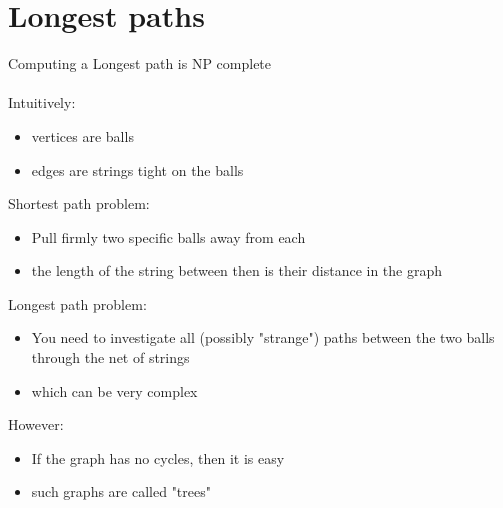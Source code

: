 \documentclass{article}[18pt]
\begin{document}
\section{Longest paths}
Computing a Longest path is NP complete\\
\\
Intuitively:
\begin{itemize}
	\item vertices are balls
	\item edges are strings tight on the balls
\end{itemize}
Shortest path problem:
\begin{itemize}
	\item Pull firmly two specific balls away from each
	\item the length of the string between then is their distance in the graph
\end{itemize}
Longest path problem:
\begin{itemize}
	\item You need to investigate all (possibly "strange") paths between the two balls through the net of strings
	\item which can be very complex
\end{itemize}
However:
\begin{itemize}
	\item If the graph has no cycles, then it is easy
	\item such graphs are called "trees"
\end{itemize}
\end{document}
